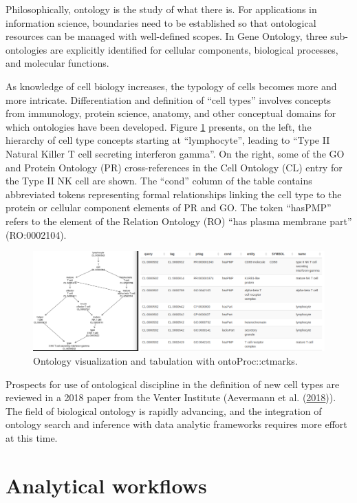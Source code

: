 Philosophically, ontology is the study of what there is. For
applications in information
science,
boundaries need to be established so that ontological
resources can be managed with well-defined scopes. In Gene
Ontology, three sub-ontologies are explicitly identified for
cellular components, biological processes, and molecular functions.

As knowledge of cell biology increases, the typology of
cells becomes more and more intricate. Differentiation
and definition
of ``cell types'' involves concepts from immunology,
protein science, anatomy, and other conceptual domains
for which ontologies have been developed. Figure \ref{fig:ontopair}
presents, on the left, the hierarchy of cell type concepts starting at ``lymphocyte'',
leading to ``Type II Natural Killer T cell secreting interferon gamma''.
On the right, some of the GO and Protein Ontology (PR) cross-references
in the Cell Ontology (CL) entry for the Type II NK cell are shown.
The ``cond'' column of the table contains abbreviated tokens
representing formal relationships linking the cell type
to the protein or cellular component elements of PR and GO.
The token ``hasPMP'' refers to the element of the Relation Ontology
(RO) ``has plasma membrane part'' (RO:0002104).

\begin{figure}
\includegraphics[width=1\linewidth,]{ontoPair} \caption{Ontology visualization and tabulation with ontoProc::ctmarks.}\label{fig:ontopair}
\end{figure}

Prospects for use of ontological discipline in the
definition of new cell types are reviewed in a 2018
paper from the Venter Institute (Aevermann et al. (\protect\hyperlink{ref-Aevermann2018}{2018})).
The field of biological ontology is rapidly advancing,
and the integration of ontology search and inference
with data analytic frameworks requires more effort at this time.

\hypertarget{analytical-workflows}{%
\section{Analytical workflows}\label{analytical-workflows}}

